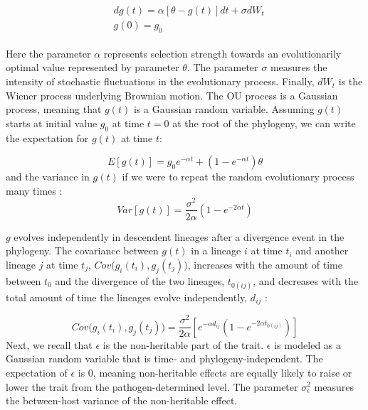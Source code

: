 \documentclass[11pt]{article}
\begin{document}
\begin{linenumbers}
\begin{align}
\begin{split}
	&dg(t) = \alpha[\theta - g(t)]dt + \sigma dW_t \\
	&g(0) = g_0 
	\label{eq:OUprocess}
\end{split}
\end{align}

Here the parameter $\alpha$ represents selection strength towards an evolutionarily optimal value represented by parameter $\theta$. The parameter $\sigma$ measures the intensity of stochastic fluctuations in the evolutionary process. Finally, $dW_t$ is the Wiener process underlying Brownian motion. The OU process is a Gaussian process, meaning that $g(t)$ is a Gaussian random variable. Assuming $g(t)$ starts at initial value $g_0$ at time $t = 0$ at the root of the phylogeny, we can write the expectation for $g(t)$ at time $t$: 

\begin{equation}
   E[g(t)] = g_0e^{-\alpha t} + (1 - e^{-\alpha t})\theta \label{eq:OUmean}
\end{equation}
and the variance in $g(t)$ if we were to repeat the random evolutionary process many times \citep{Butler2004}:
\begin{equation}
    Var[g(t)] = \frac{\sigma^2}{2\alpha}(1 - e^{-2\alpha t}) \label{eq:OUVar}
\end{equation}

$g$ evolves independently in descendent lineages after a divergence event in the phylogeny. The covariance between $g(t)$ in a lineage $i$ at time $t_i$ and another lineage $j$ at time $t_j$, $Cov\big(g_{i}(t_i), g_{j}(t_j)\big)$, increases with the amount of time between $t_0$ and the divergence of the two lineages, $t_{0(ij)}$, and decreases with the total amount of time the lineages evolve independently, $d_{ij}$ \citep{Butler2004}: 

\begin{equation}
	Cov\big(g_{i}(t_i), g_{j}(t_j)\big) = \frac{\sigma^2}{2\alpha}[e^{-\alpha d_{ij}}(1 - e^{-2\alpha t_{0(ij)}})]
	\label{eq:OUcov}
\end{equation}
Next, we recall that $\epsilon$ is the non-heritable part of the trait. $\epsilon$ is modeled as a Gaussian random variable that is time- and phylogeny-independent. The expectation of $\epsilon$ is 0, meaning non-heritable effects are equally likely to raise or lower the trait from the pathogen-determined level. The parameter $\sigma_\epsilon^2$ measures the between-host variance of the non-heritable effect.


\end{linenumbers}
\end{document}
